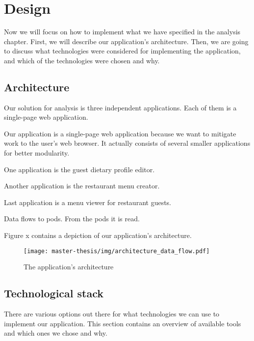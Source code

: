 \chapter{Design}
Now we will focus on how to implement what we have specified in the analysis chapter.
First, we will describe our application's architecture.
Then, we are going to discuss what technologies were considered for implementing the application, and which of the technologies were chosen and why.

\section{Architecture}
Our solution for analysis is three independent applications. 
Each of them is a single-page web application.

Our application is a single-page web application because we want to mitigate work to the user's web browser.
It actually consists of several smaller applications for better modularity.

One application is the guest dietary profile editor.

Another application is the restaurant menu creator.

Last application is a menu viewer for restaurant guests.

Data flows to pods.
From the pods it is read.

Figure x contains a depiction of our application's architecture.

\begin{figure}[h]
  \centering
  \texttt{[image: master-thesis/img/architecture\_data\_flow.pdf]}
  \caption{The application's architecture}
\end{figure}

\section{Technological stack}
There are various options out there for what technologies we can use to implement our application.
This section contains an overview of available tools and which ones we chose and why.

